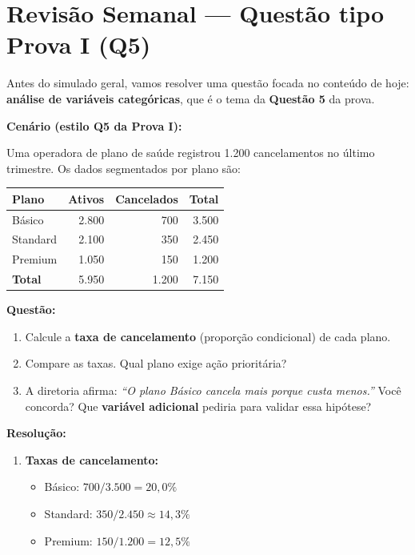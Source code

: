 \section{Revisão Semanal — Questão tipo Prova I (Q5)}

\begin{NoteBox}
Antes do simulado geral, vamos resolver uma questão focada no conteúdo
de hoje: \textbf{análise de variáveis categóricas}, que é o tema da
\textbf{Questão 5} da prova.
\end{NoteBox}

\begin{SolvedBox}
\textbf{Cenário (estilo Q5 da Prova I):}

Uma operadora de plano de saúde registrou 1.200 cancelamentos no último
trimestre. Os dados segmentados por plano são:

\begin{center}
\begin{tabular}{|l|r|r|r|}
\hline
\textbf{Plano} & \textbf{Ativos} & \textbf{Cancelados} & \textbf{Total} \\
\hline
Básico    & 2.800 & 700 & 3.500 \\
Standard  & 2.100 & 350 & 2.450 \\
Premium   & 1.050 & 150 & 1.200 \\
\hline
\textbf{Total} & 5.950 & 1.200 & 7.150 \\
\hline
\end{tabular}
\end{center}

\textbf{Questão:}
\begin{enumerate}
  \item Calcule a \textbf{taxa de cancelamento} (proporção condicional) de
  cada plano.
  \item Compare as taxas. Qual plano exige ação prioritária?
  \item A diretoria afirma: \textit{``O plano Básico cancela mais porque
  custa menos.''} Você concorda? Que \textbf{variável adicional} pediria
  para validar essa hipótese?
\end{enumerate}

\textbf{Resolução:}
\begin{enumerate}
  \item \textbf{Taxas de cancelamento:}
  \begin{itemize}
    \item Básico: $700 / 3.500 = 20{,}0\%$
    \item Standard: $350 / 2.450 \approx 14{,}3\%$
    \item Premium: $150 / 1.200 = 12{,}5\%$
  \end{itemize}
  

\end{enumerate}
\end{SolvedBox}
